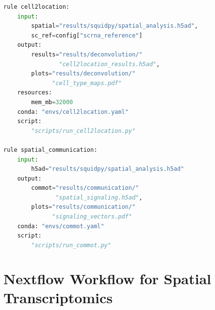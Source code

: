 \begin{lstlisting}[language=Python, caption={Snakemake workflow for 10x Visium
spatial transcriptomics analysis.}, label={lst:spatial:snakemake}]
rule cell2location:
    input:
        spatial="results/squidpy/spatial_analysis.h5ad",
        sc_ref=config["scrna_reference"]
    output:
        results="results/deconvolution/"
                "cell2location_results.h5ad",
        plots="results/deconvolution/"
              "cell_type_maps.pdf"
    resources:
        mem_mb=32000
    conda: "envs/cell2location.yaml"
    script:
        "scripts/run_cell2location.py"

rule spatial_communication:
    input:
        h5ad="results/squidpy/spatial_analysis.h5ad"
    output:
        commot="results/communication/"
               "spatial_signaling.h5ad",
        plots="results/communication/"
              "signaling_vectors.pdf"
    conda: "envs/commot.yaml"
    script:
        "scripts/run_commot.py"
\end{lstlisting}


\section{Nextflow Workflow for Spatial Transcriptomics}
\label{sec:spatial:nextflow}

